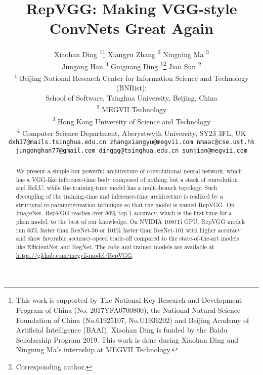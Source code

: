 \documentclass[final]{cvpr}
\begin{document}
\title{RepVGG: Making VGG-style ConvNets Great Again}


\author{Xiaohan Ding \textsuperscript{1}\thanks{This work is supported by The National Key Research and Development Program of China (No. 2017YFA0700800), the National Natural Science Foundation of China (No.61925107, No.U1936202) and Beijing Academy of Artificial Intelligence (BAAI). Xiaohan Ding is funded by the Baidu Scholarship Program 2019. This work is done during Xiaohan Ding and Ningning Ma's internship at MEGVII Technology.} \quad Xiangyu Zhang \textsuperscript{2} \quad Ningning Ma \textsuperscript{3} \\
	Jungong Han \textsuperscript{4} \quad Guiguang Ding \textsuperscript{1}\thanks{Corresponding author.} \quad Jian Sun \textsuperscript{2} \\
	\textsuperscript{1} Beijing National Research Center for Information Science and Technology (BNRist); \\School of Software, Tsinghua University, Beijing, China \\
	\textsuperscript{2} MEGVII Technology \\
	\textsuperscript{3} Hong Kong University of Science and Technology \\
	\textsuperscript{4} Computer Science Department, Aberystwyth University, SY23 3FL, UK \\
	\tt\small dxh17@mails.tsinghua.edu.cn \quad zhangxiangyu@megvii.com \quad nmaac@cse.ust.hk\\
	\tt\small jungonghan77@gmail.com \quad dinggg@tsinghua.edu.cn \quad sunjian@megvii.com \\
}



\maketitle
\pagestyle{empty}
\thispagestyle{empty}

\begin{abstract}
	We present a simple but powerful architecture of convolutional neural network, which has a VGG-like inference-time body composed of nothing but a stack of  convolution and ReLU, while the training-time model has a multi-branch topology. Such decoupling of the training-time and inference-time architecture is realized by a structural re-parameterization technique so that the model is named RepVGG. On ImageNet, RepVGG reaches over 80\% top-1 accuracy, which is the first time for a plain model, to the best of our knowledge. On NVIDIA 1080Ti GPU, RepVGG models run 83\% faster than ResNet-50 or 101\% faster than ResNet-101 with higher accuracy and show favorable accuracy-speed trade-off compared to the state-of-the-art models like EfficientNet and RegNet. The code and trained models are available at \url{https://github.com/megvii-model/RepVGG}.
\end{abstract}
\end{document}
